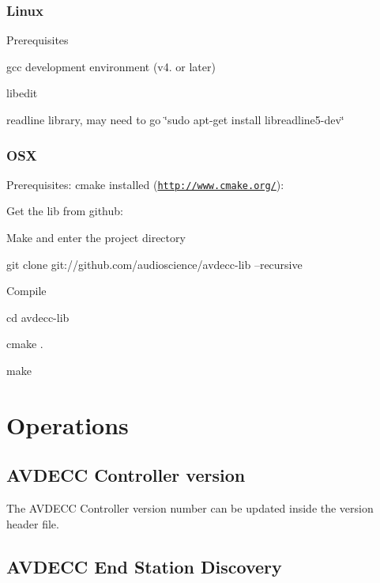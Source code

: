 \subsubsection*{Linux}

Prerequisites


\begin{DoxyEnumerate}
\item gcc development environment (v4. or later)
\item libedit
\item readline library, may need to go \char`\"{}sudo apt-\/get install libreadline5-\/dev\char`\"{}
\end{DoxyEnumerate}

\subsubsection*{O\+SX}

Prerequisites\+: cmake installed (\href{http://www.cmake.org/}{\tt http\+://www.\+cmake.\+org/})\+:

Get the lib from github\+:
\begin{DoxyItemize}
\item Make and enter the project directory
\item git clone git\+://github.com/audioscience/avdecc-\/lib --recursive
\end{DoxyItemize}

Compile
\begin{DoxyItemize}
\item cd avdecc-\/lib
\item cmake .
\item make
\end{DoxyItemize}

\section*{Operations }

\subsection*{A\+V\+D\+E\+CC Controller version }

The A\+V\+D\+E\+CC Controller version number can be updated inside the version header file.

\subsection*{A\+V\+D\+E\+CC End Station Discovery }

